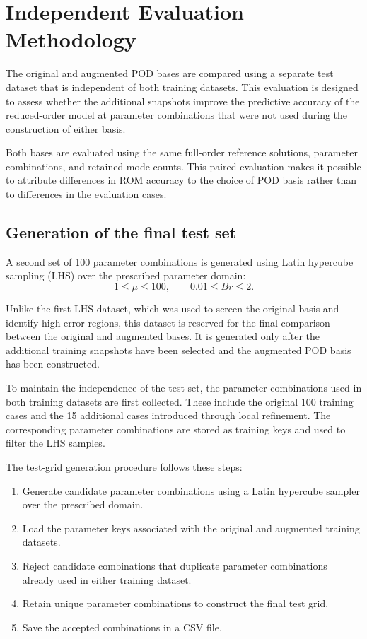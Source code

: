 \section{Independent Evaluation Methodology}
\label{sec:independent_evaluation}

The original and augmented POD bases are compared using a
separate test dataset that is independent of both training
datasets. This evaluation is designed to assess whether the
additional snapshots improve the predictive accuracy of the
reduced-order model at parameter combinations that were not
used during the construction of either basis.

Both bases are evaluated using the same full-order reference
solutions, parameter combinations, and retained mode counts.
This paired evaluation makes it possible to attribute
differences in ROM accuracy to the choice of POD basis rather
than to differences in the evaluation cases.

\subsection{Generation of the final test set}

A second set of 100 parameter combinations is generated using
Latin hypercube sampling (LHS) over the prescribed parameter
domain:
\[
1\leq\mu\leq100,
\qquad
0.01\leq Br\leq2.
\]

Unlike the first LHS dataset, which was used to screen the
original basis and identify high-error regions, this dataset
is reserved for the final comparison between the original
and augmented bases. It is generated only after the
additional training snapshots have been selected and the
augmented POD basis has been constructed.

To maintain the independence of the test set, the parameter
combinations used in both training datasets are first
collected. These include the original 100 training cases
and the 15 additional cases introduced through local
refinement. The corresponding parameter combinations are
stored as training keys and used to filter the LHS samples.

The test-grid generation procedure follows these steps:
\begin{enumerate}
    \item Generate candidate parameter combinations using
    a Latin hypercube sampler over the prescribed domain.
    \item Load the parameter keys associated with the
    original and augmented training datasets.
    \item Reject candidate combinations that duplicate
    parameter combinations already used in either training
    dataset.
    \item Retain unique parameter combinations to construct
    the final test grid.
    \item Save the accepted combinations in a CSV file.
\end{enumerate}

